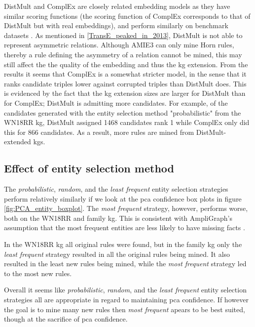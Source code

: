 DistMult and ComplEx are closely related embedding models as they have similar scoring functions (the scoring function of ComplEx corresponds to that of DistMult but with real embeddings), and perform similarly on benchmark datasets \cite{complEx}. As mentioned in \cref{TransE_peaked_in_2013}, DistMult is not able to represent asymmetric relations. Although AMIE3 can only mine Horn rules, thereby a rule defining the asymmetry of a relation cannot be mined, this may still affect the the quality of the embedding and thus the \gls{kg} extension. From the results it seems that ComplEx is a somewhat stricter model, in the sense that it ranks candidate triples lower against corrupted triples than DistMult does. This is evidenced by the fact that the \gls{kg} extension sizes are larger for DistMult than for ComplEx; DistMult is admitting more candidates. For example, of the candidates generated with the entity selection method "probabilistic" from the WN18RR \gls{kg}, DistMult assigned 1468 candidates rank 1 while ComplEx only did this for 866 candidates. As a result, more rules are mined from DistMult-extended \glspl{kg}. 

\newpage
\subsection{Effect of entity selection method}
The \textit{probabilistic}, \textit{random}, and the \textit{least frequent} entity selection strategies perform relatively similarly if we look at the \gls{pca} confidence box plots in figure \ref{fig:PCA_entity_boxplot}. The \textit{most frequent} strategy, however, performs worse, both on the WN18RR and family \gls{kg}. This is consistent with AmpliGraph's assumption that the most frequent entities are less likely to have missing facts \cite{kge_tutorial}.

In the WN18RR \gls{kg} all original rules were found, but in the family \gls{kg} only the \textit{least frequent} strategy resulted in all the original rules being mined. It also resulted in the least new rules being mined, while the \textit{most frequent} strategy led to the most new rules.

Overall it seems like \textit{probabilistic}, \textit{random}, and the \textit{least frequent} entity selection strategies all are appropriate in regard to maintaining \gls{pca} confidence. If however the goal is to mine many new rules then \textit{most frequent} apears to be best suited, though at the sacrifice of \gls{pca} confidence.

